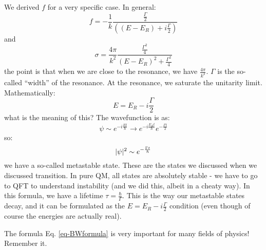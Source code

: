 We derived $f$ for a very specific case. In general:
\begin{equation}
    f = -\frac{1}{k}\frac{\frac{\Gamma}{2}}{\left((E - E_R) + i\frac{\Gamma}{2}\right)}
\end{equation}
and
\begin{equation}\label{eq-BWformula}
    \sigma = \frac{4\pi}{k^2}\frac{\frac{\Gamma^2}{4}}{(E - E_R)^2 + \frac{\Gamma^2}{4}}
\end{equation}
the point is that when we are close to the resonance, we have $\frac{4\pi}{k^2}$. $\Gamma$ is the so-called ``width'' of the resonance. At the resonance, we saturate the unitarity limit. Mathematically:
\begin{equation}
    E = E_R - i\frac{\Gamma}{2}
\end{equation}
what is the meaning of this? The wavefunction is as:
\begin{equation}
    \psi \sim e^{-i\frac{Et}{\hbar}} \to e^{-i\frac{E_R t}{\hbar}}e^{-\frac{\Gamma t}{2}}
\end{equation}
so:
\begin{equation}
    \lvert \psi \rvert^2 \sim e^{-\frac{\Gamma t}{\hbar}}
\end{equation}
we have a so-called metastable state. These are the states we discussed when we discussed transition. In pure QM, all states are absolutely stable - we have to go to QFT to understand instability (and we did this, albeit in a cheaty way). In this formula, we have a lifetime $\tau = \frac{\hbar}{\Gamma}$. This is the way our metastable states decay, and it can be formulated as the $E = E_R - i\frac{\Gamma}{2}$ condition (even though of course the energies are actually real).

The formula Eq. \eqref{eq-BWformula} is very important for many fields of physics! Remember it.